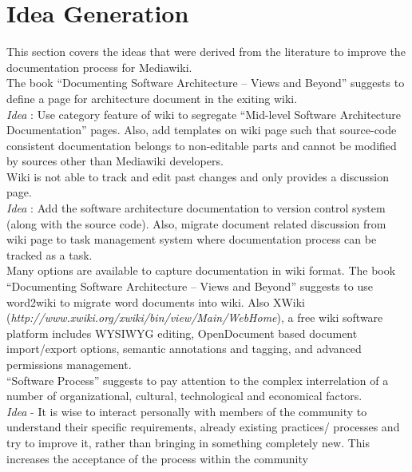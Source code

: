 \section{Idea Generation}
\indent This section covers the ideas that were derived from the literature to improve the documentation process for Mediawiki.
\\\indent The book \enquote{Documenting Software Architecture – Views and Beyond} \cite{BachmannDocumentingSoftware2010} suggests to define a page for architecture document in the exiting wiki.
\\\indent \emph{Idea} : Use category feature of wiki to segregate \enquote{Mid-level Software Architecture Documentation} pages. Also, add templates on wiki page such that source-code consistent documentation belongs to non-editable parts and cannot be modified by sources other than Mediawiki developers.
\newline
\\\indent Wiki is not able to track and edit past changes and only provides a discussion page.
\\\indent \emph{Idea} : Add the software architecture documentation to version control system (along with the source code). Also, migrate document related discussion from wiki page to task management system where documentation process can be tracked as a task.
\\\indent Many options are available to capture documentation in wiki format. The book \enquote{Documenting Software Architecture – Views and Beyond} \cite{BachmannDocumentingSoftware2010} suggests to use word2wiki to migrate word documents into wiki. Also XWiki (\emph{http://www.xwiki.org/xwiki/bin/view/Main/WebHome}), a free wiki software platform includes WYSIWYG editing, OpenDocument based document import/export options, semantic annotations and tagging, and advanced permissions management.
\newline
\\\indent \enquote{Software Process} \cite{Fuggeffa1988} suggests to pay attention to the complex interrelation of a number of organizational, cultural, technological and economical factors.
\\\indent\emph{Idea}	- It is wise to interact personally with members of the community to understand their specific requirements, already existing practices/ processes and try to improve it, rather than bringing in something completely new. This increases the acceptance of the process within the community
\newline
